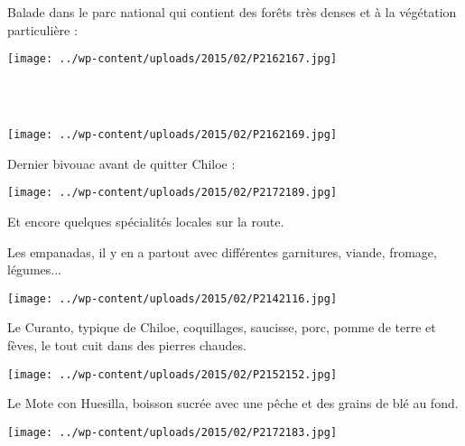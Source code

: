 \pagebreak
 Balade dans le parc national qui contient des forêts très denses et à la végétation particulière :
 \vspace{-2mm}
\begin{center} \texttt{[image: ../wp-content/uploads/2015/02/P2162167.jpg]} \end{center}
~\\
~
\vspace{3mm}
\begin{center} \texttt{[image: ../wp-content/uploads/2015/02/P2162169.jpg]} \end{center}
\vspace{-\topsep}

\pagebreak
  Dernier bivouac avant de quitter Chiloe :\\
\begin{center} \texttt{[image: ../wp-content/uploads/2015/02/P2172189.jpg]} \end{center}

 Et encore quelques spécialités locales sur la route.

 Les empanadas, il y en a partout avec différentes garnitures, viande, fromage, légumes...
\begin{center} \texttt{[image: ../wp-content/uploads/2015/02/P2142116.jpg]} \end{center}
\vspace{-\topsep}

\pagebreak
 Le Curanto, typique de Chiloe, coquillages, saucisse, porc, pomme de terre et fèves, le tout cuit dans des pierres chaudes.
 \vfill
 \begin{center} \texttt{[image: ../wp-content/uploads/2015/02/P2152152.jpg]} \end{center}

\vfill
 Le Mote con Huesilla, boisson sucrée avec une pêche et des grains de blé au fond.
 \vfill
\begin{center} \texttt{[image: ../wp-content/uploads/2015/02/P2172183.jpg]} \end{center}
\vspace{-\topsep}
\vspace{-0.75mm}